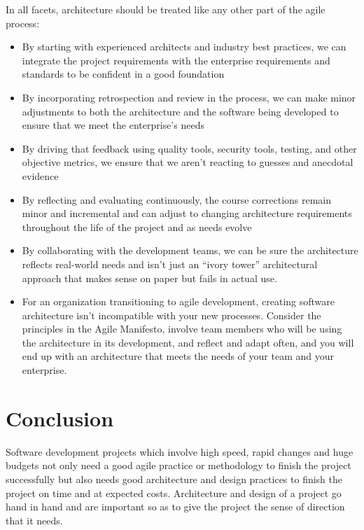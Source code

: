 \documentclass[sigplan,screen]{acmart}
\begin{document}
In all facets, architecture should be treated like any other part of the agile process:\cite{Architecture01}
\begin{itemize}
\item{} By starting with experienced architects and industry best practices, we can integrate the project requirements with the enterprise requirements and standards to be confident in a good foundation
\item{} By incorporating retrospection and review in the process, we can make minor adjustments to both the architecture and the software being developed to ensure that we meet the enterprise's needs
\item{} By driving that feedback using quality tools, security tools, testing, and other objective metrics, we ensure that we aren't reacting to guesses and anecdotal evidence
\item{} By reflecting and evaluating continuously, the course corrections remain minor and incremental and can adjust to changing architecture requirements throughout the life of the project and as needs evolve
\item{} By collaborating with the development teams, we can be sure the architecture reflects real-world needs and isn’t just an “ivory tower” architectural approach that makes sense on paper but fails in actual use.
\item{} For an organization transitioning to agile development, creating software architecture isn’t incompatible with your new processes. Consider the principles in the Agile Manifesto, involve team members who will be using the architecture in its development, and reflect and adapt often, and you will end up with an architecture that meets the needs of your team and your enterprise.
\end{itemize}

\section{Conclusion}
Software development projects which involve high speed, rapid changes and huge budgets not only need a good agile practice or methodology to finish the project successfully but also needs good architecture and design practices to finish the project on time and at expected costs. Architecture and design of a project go hand in hand and are important so as to give the project the sense of direction that it needs.

%



% 
\appendix
\end{document}

